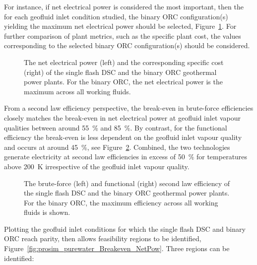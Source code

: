     For instance, if net electrical power is considered the most important, then the for each geofluid inlet condition studied, the binary \ac{ORC} configuration(s) yielding the maximum net electrical power should be selected, Figure~\ref{fig:prosim_purewater_Wnet_DSC_vs_ORC}. For further comparison of plant metrics, such as the specific plant cost, the values corresponding to the selected binary \ac{ORC} configuration(s) should be considered. 

    \begin{figure}[H]
        \centering
        
        \caption[The net electrical power and the corresponding specific cost of the single flash \ac{DSC} and the binary \ac{ORC} geothermal power plants.]{The net electrical power (left) and the corresponding specific cost (right) of the single flash \ac{DSC} and the binary \ac{ORC} geothermal power plants. For the binary \ac{ORC},  the net electrical power is the maximum across all working fluids.}
        \label{fig:prosim_purewater_Wnet_DSC_vs_ORC}
    \end{figure}

    From a second law efficiency perspective, the break-even in brute-force efficiencies closely matches the break-even in net electrical power at geofluid inlet vapour qualities between around \qty{55}{\percent} and \qty{85}{\percent}. By contrast, for the functional efficiency the break-even is less dependent on the geofluid inlet vapour quality and occurs at around \qty{45}{\percent}, see Figure~\ref{fig:prosim_purewater_EFF_II_DSC_vs_ORC}. Combined, the two technologies generate electricity at second law efficiencies in excess of \qty{50}{\percent} for temperatures above \qty{200}{\K} irrespective of the geofluid inlet vapour quality.   

    \begin{figure}[H]
        \centering
        
        \caption[The brute-force and functional second law efficiency of the single flash \ac{DSC} and the binary \ac{ORC} geothermal power plants.]{The brute-force (left) and functional (right) second law efficiency of the single flash \ac{DSC} and the binary \ac{ORC} geothermal power plants. For the binary \ac{ORC},  the maximum efficiency across all working fluids is shown.}
        \label{fig:prosim_purewater_EFF_II_DSC_vs_ORC}
    \end{figure}

    Plotting the geofluid inlet conditions for which the single flash \ac{DSC} and binary \ac{ORC} reach parity, then allows feasibility regions to be identified, Figure~\ref{fig:prosim_purewater_Breakeven_NetPow}. Three regions can be identified:

